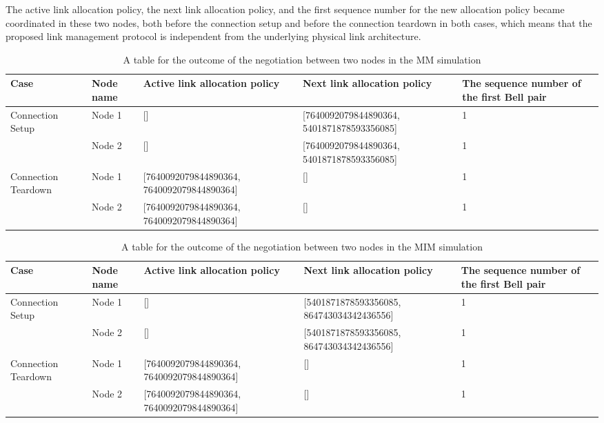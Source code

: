 The active link allocation policy, the next link allocation policy, and the first sequence number for the new allocation policy became coordinated in these two nodes, both before the connection setup and before the connection teardown in both cases,
which means that the proposed link management protocol is independent from the underlying physical link architecture.

\begin{table}[ht]
  \begin{center}
    \begin{tabular}{|m{5em}|m{5em}|m{10em}|m{10em}|m{5em}|} \hline
      Case & Node name  & Active link allocation policy & Next link allocation policy & The sequence number of the first Bell pair \\ \hline \cline{1-5}
      Connection Setup & Node 1 & [] & [7640092079844890364, 5401871878593356085] & 1 \\ \cline{1-5}
       & Node 2 & [] & [7640092079844890364, 5401871878593356085] & 1 \\ \cline{1-5}
       Connection Teardown & Node 1 & [7640092079844890364, 7640092079844890364]& [] & 1 \\ \cline{1-5}
       & Node 2 & [7640092079844890364, 7640092079844890364] & [] & 1 \\ \cline{1-5}
    \end{tabular}
    \caption{A table for the outcome of the negotiation between two nodes in the MM simulation}
  \end{center}
\end{table}

\begin{table}[ht]
  \begin{center}
    \begin{tabular}{|m{5em}|m{5em}|m{10em}|m{10em}|m{5em}|} \hline
      Case & Node name  & Active link allocation policy & Next link allocation policy & The sequence number of the first Bell pair \\ \hline \cline{1-5}
      Connection Setup & Node 1 & [] & [5401871878593356085, 864743034342436556] & 1 \\ \cline{1-5}
       & Node 2 & [] & [5401871878593356085, 864743034342436556] & 1 \\ \cline{1-5}
       Connection Teardown & Node 1 & [7640092079844890364, 7640092079844890364] & [] & 1 \\ \cline{1-5}
       & Node 2 & [7640092079844890364, 7640092079844890364] & [] & 1 \\ \cline{1-5}
    \end{tabular}
    \caption{A table for the outcome of the negotiation between two nodes in the MIM simulation}
  \end{center}
\end{table}

